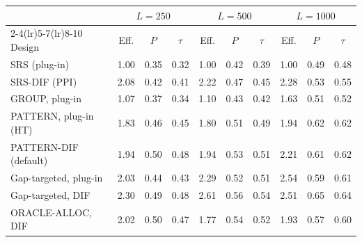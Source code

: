 \begin{tabular}{lccccccccc}
\toprule
 & \multicolumn{3}{c}{$L=250$} & \multicolumn{3}{c}{$L=500$} & \multicolumn{3}{c}{$L=1000$} \\
\cmidrule(lr){2-4}\cmidrule(lr){5-7}\cmidrule(lr){8-10}
Design & Eff. & $P$ & $\tau$ & Eff. & $P$ & $\tau$ & Eff. & $P$ & $\tau$ \\
\midrule
SRS (plug-in) & 1.00 & 0.35 & 0.32 & 1.00 & 0.42 & 0.39 & 1.00 & 0.49 & 0.48 \\
SRS-DIF (PPI) & 2.08 & 0.42 & 0.41 & 2.22 & 0.47 & 0.45 & 2.28 & 0.53 & 0.55 \\
GROUP, plug-in & 1.07 & 0.37 & 0.34 & 1.10 & 0.43 & 0.42 & 1.63 & 0.51 & 0.52 \\
PATTERN, plug-in (HT) & 1.83 & 0.46 & 0.45 & 1.80 & 0.51 & 0.49 & 1.94 & 0.62 & 0.62 \\
PATTERN-DIF (default) & 1.94 & 0.50 & 0.48 & 1.94 & 0.53 & 0.51 & 2.21 & 0.61 & 0.62 \\
Gap-targeted, plug-in & 2.03 & 0.44 & 0.43 & 2.29 & 0.52 & 0.51 & 2.54 & 0.59 & 0.61 \\
Gap-targeted, DIF & 2.30 & 0.49 & 0.48 & 2.61 & 0.56 & 0.54 & 2.51 & 0.65 & 0.64 \\
ORACLE-ALLOC, DIF & 2.02 & 0.50 & 0.47 & 1.77 & 0.54 & 0.52 & 1.93 & 0.57 & 0.60 \\
\bottomrule
\end{tabular}
